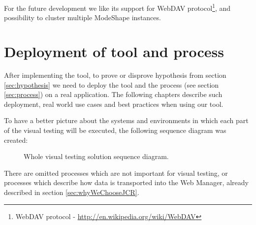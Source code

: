 \documentclass[11pt,oneside,final]{fithesis2}
\begin{document}
    For the future development we like its support for 
    WebDAV protocol\footnote{WebDAV protocol - \url{http://en.wikipedia.org/wiki/WebDAV}}, and possibility to cluster multiple
    ModeShape instances.
    
\chapter{Deployment of tool and process}
After implementing the tool, to prove or disprove hypothesis from section \ref{sec:hypothesis} we need to deploy the tool and the
process (see section \ref{sec:process}) on a real application. The following chapters describe such deployment, real world use cases
and best practices when using our tool.

To have a better picture about the systems and environments in which each part of the visual testing will be executed, the following
sequence diagram was created:

\begin{figure}[!htb]
      \begin{center}
      \leavevmode
      \centerline{}
      \end{center}
      \caption{Whole visual testing solution sequence diagram.}
      \label{fig:wholeSolutionSequenceDiagram}
\end{figure}

There are omitted processes which are not important for visual testing, or processes which describe how data is transported into
the Web Manager, already described in section \ref{sec:whyWeChooseJCR}.
  
\end{document}
